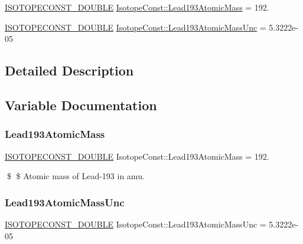 \begin{DoxyCompactItemize}
\item 
\mbox{\hyperlink{group___isotope_const-_macros_ga8f45a7272ce02c0b4c65c44636ed719a}{I\+S\+O\+T\+O\+P\+E\+C\+O\+N\+S\+T\+\_\+\+D\+O\+U\+B\+LE}} \mbox{\hyperlink{group___isotope_const-_lead-_pb193_gab8f0195adf52bc90766985b8c3ec521f}{Isotope\+Const\+::\+Lead193\+Atomic\+Mass}} = 192.
\item 
\mbox{\hyperlink{group___isotope_const-_macros_ga8f45a7272ce02c0b4c65c44636ed719a}{I\+S\+O\+T\+O\+P\+E\+C\+O\+N\+S\+T\+\_\+\+D\+O\+U\+B\+LE}} \mbox{\hyperlink{group___isotope_const-_lead-_pb193_gaafe446e2059b20ee5038bb27ab8e74ec}{Isotope\+Const\+::\+Lead193\+Atomic\+Mass\+Unc}} = 5.\+3222e-\/05
\end{DoxyCompactItemize}


\subsection{Detailed Description}


\subsection{Variable Documentation}
\mbox{\label{group___isotope_const-_lead-_pb193_gab8f0195adf52bc90766985b8c3ec521f}} 
\subsubsection{\texorpdfstring{Lead193\+Atomic\+Mass}{Lead193AtomicMass}}
{\footnotesize\ttfamily \mbox{\hyperlink{group___isotope_const-_macros_ga8f45a7272ce02c0b4c65c44636ed719a}{I\+S\+O\+T\+O\+P\+E\+C\+O\+N\+S\+T\+\_\+\+D\+O\+U\+B\+LE}} Isotope\+Const\+::\+Lead193\+Atomic\+Mass = 192.}

\$ \$ Atomic mass of Lead-\/193 in amu. \mbox{\label{group___isotope_const-_lead-_pb193_gaafe446e2059b20ee5038bb27ab8e74ec}} 
\subsubsection{\texorpdfstring{Lead193\+Atomic\+Mass\+Unc}{Lead193AtomicMassUnc}}
{\footnotesize\ttfamily \mbox{\hyperlink{group___isotope_const-_macros_ga8f45a7272ce02c0b4c65c44636ed719a}{I\+S\+O\+T\+O\+P\+E\+C\+O\+N\+S\+T\+\_\+\+D\+O\+U\+B\+LE}} Isotope\+Const\+::\+Lead193\+Atomic\+Mass\+Unc = 5.\+3222e-\/05}

